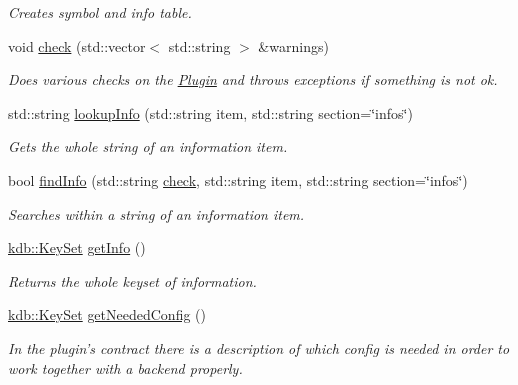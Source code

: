 \begin{DoxyCompactItemize}
\begin{DoxyCompactList}\small\item\em Creates symbol and info table. \end{DoxyCompactList}\item 
void \hyperlink{classkdb_1_1tools_1_1Plugin_a5bb3db65b9d87d18787da8cc65eaca65}{check} (std\-::vector$<$ std\-::string $>$ \&warnings)
\begin{DoxyCompactList}\small\item\em Does various checks on the \hyperlink{classkdb_1_1tools_1_1Plugin}{Plugin} and throws exceptions if something is not ok. \end{DoxyCompactList}\item 
std\-::string \hyperlink{classkdb_1_1tools_1_1Plugin_a5f1dc42adda8340f330eb902812e667d}{lookup\-Info} (std\-::string item, std\-::string section=\char`\"{}infos\char`\"{})
\begin{DoxyCompactList}\small\item\em Gets the whole string of an information item. \end{DoxyCompactList}\item 
bool \hyperlink{classkdb_1_1tools_1_1Plugin_a7911f8c46aea6fe4ec6fcb4788b77beb}{find\-Info} (std\-::string \hyperlink{classkdb_1_1tools_1_1Plugin_a5bb3db65b9d87d18787da8cc65eaca65}{check}, std\-::string item, std\-::string section=\char`\"{}infos\char`\"{})
\begin{DoxyCompactList}\small\item\em Searches within a string of an information item. \end{DoxyCompactList}\item 
\hyperlink{classkdb_1_1KeySet}{kdb\-::\-Key\-Set} \hyperlink{classkdb_1_1tools_1_1Plugin_aa4eac3b2b515104a0d595c717c546ec0}{get\-Info} ()
\begin{DoxyCompactList}\small\item\em Returns the whole keyset of information. \end{DoxyCompactList}\item 
\hyperlink{classkdb_1_1KeySet}{kdb\-::\-Key\-Set} \hyperlink{classkdb_1_1tools_1_1Plugin_ad2a0a4a64d17c479e7cd8b1402275cc7}{get\-Needed\-Config} ()
\begin{DoxyCompactList}\small\item\em In the plugin's contract there is a description of which config is needed in order to work together with a backend properly. \end{DoxyCompactList}\item 

\end{DoxyCompactItemize}
